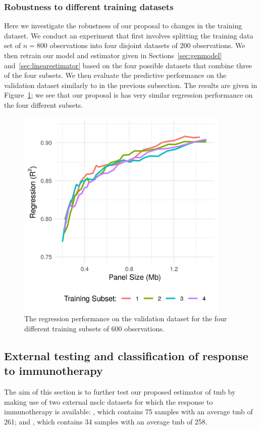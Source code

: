 \documentclass[../thesis.tex]{subfiles}
\begin{document}
\subsubsection{Robustness to different training datasets}
{Here we investigate the robustness of our proposal to changes in the training dataset. We conduct an experiment that first involves splitting the training data set of $n = 800$ observations into four disjoint datasets of $200$ observations. We then retrain our model and estimator given in Sections~\ref{sec:genmodel} and~\ref{sec:linearestimator} based on the four possible datasets that combine three of the four subsets. We then evaluate the predictive performance on the validation dataset similarly to in the previous subsection. The results are given in Figure~\ref{fig:robust}; we see that our proposal is has very similar regression performance on the four different subsets. }

\begin{figure}
    \centering
    \includegraphics[width=4in]{../figures/chapter3/robust.png}
    \caption{{The regression performance on the validation dataset for the four different training subsets of 600 observations.}}
    \label{fig:robust}
\end{figure}


\subsection{External testing and classification of response to immunotherapy} 
{The aim of this section is to further test our proposed estimator of \gls{tmb} by making use of {two external \gls{nsclc} datasets for which the response to immunotherapy is available: \citet{hellmann_genomic_2018}, which contains 75 samples with an average \gls{tmb} of 261; and \citet{rizvi_mutational_2015}, which contains 34 samples with an average \gls{tmb} of 258}.}
\end{document}
